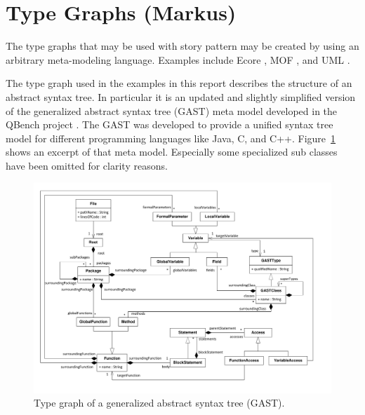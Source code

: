 \section{Type Graphs (Markus)}
\label{sec:typeGraph}

The type graphs that may be used with story pattern may be created by using an arbitrary meta-modeling language. Examples include Ecore \cite{SBP+08}, MOF \cite{MOF05}, and UML \cite{UML23}.

The type graph used in the examples in this report describes the structure of an abstract syntax tree. In particular it is an updated and slightly simplified version of the generalized abstract syntax tree (GAST) meta model developed in the QBench project \cite{QBench}. The GAST was developed to provide a unified syntax tree model for different programming languages like Java, C, and C++. Figure~\ref{fig:gast-mm} shows an excerpt of that meta model. Especially some specialized sub classes have been omitted for clarity reasons.

\begin{figure}[htbp]
  \centering
  \includegraphics[width=\linewidth]{figures/gast-mm}
  \caption{Type graph of a generalized abstract syntax tree (GAST).}
  \label{fig:gast-mm}
\end{figure}


